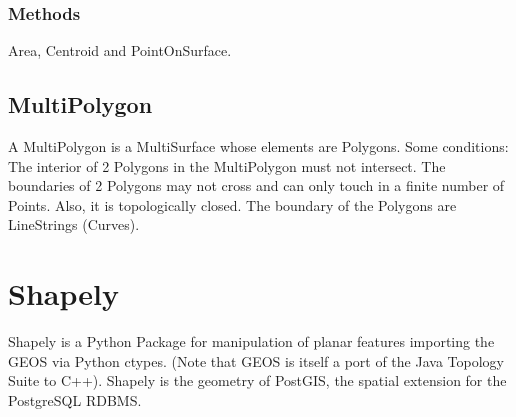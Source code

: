 \documentclass[11pt]{article}
\begin{document}
\subsubsection{Methods}
Area, Centroid and PointOnSurface.

\subsection{MultiPolygon}
A MultiPolygon is a MultiSurface whose elements are Polygons. Some conditions: The interior of 2 Polygons in the MultiPolygon must not intersect. The boundaries of 2 Polygons may not cross and can only touch in a finite number of Points. Also, it is topologically closed. The boundary of the Polygons are LineStrings (Curves).

\section{Shapely}
Shapely \cite{shapely_web} is a Python Package for manipulation of planar features importing the GEOS \cite{geos_web} via Python ctypes. (Note that GEOS is itself a port of the Java Topology Suite to C++). Shapely is the geometry of PostGIS, the spatial extension for the PostgreSQL RDBMS. 



\end{document}
